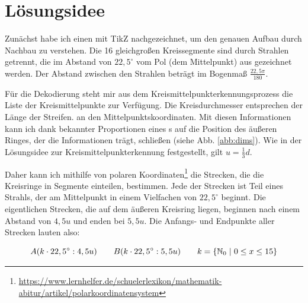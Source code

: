 \section{Lösungsidee}
	\begin{figure}
		\setlength\intextsep{0pt}
		\centering
		
		\caption{}
		\label{abb:spidergrafik}
		\vspace{-20pt}
	\end{figure}
	Zunächst habe ich einen \task{} mit TikZ nachgezeichnet, um den genauen Aufbau durch Nachbau zu verstehen. Die 16 gleichgroßen Kreissegmente sind durch Strahlen getrennt, die im Abstand von \(22,5^{\circ}\) vom Pol (dem Mittelpunkt) aus gezeichnet werden. Der Abstand zwischen den Strahlen beträgt im Bogenmaß \(\frac{22,5\pi}{180}\).

	Für die Dekodierung steht mir aus dem Kreismittelpunkterkennungsprozess die Liste der Kreismittelpunkte zur Verfügung. Die Kreisdurchmesser entsprechen der Länge der Streifen. an den Mittelpunktskoordinaten. Mit diesen Informationen kann ich dank bekannter Proportionen eines \task{}s auf die Position des äußeren Ringes, der die Informationen trägt, schließen (siehe Abb. \ref{abb:dims}). Wie in der Lösungsidee zur Kreismittelpunkterkennung festgestellt, gilt \(u=\frac{1}{3}d\).

	\begin{figure}
		\setlength\intextsep{0pt}
		\centering	
		
		\caption{}
		\label{abb:trigon}
	\end{figure}
	Daher kann ich mithilfe von polaren Koordinaten\footnote{\url{https://www.lernhelfer.de/schuelerlexikon/mathematik-abitur/artikel/polarkoordinatensystem}} die Strecken, die die Kreisringe in Segmente einteilen, bestimmen. Jede der Strecken ist Teil eines Strahls, der am Mittelpunkt in einem Vielfachen von \(22,5^{\circ}\) beginnt. Die eigentlichen Strecken, die auf dem äußeren Kreisring liegen, beginnen nach einem Abstand von \(4,5u\) und enden bei \(5,5u\). Die Anfangs- und Endpunkte aller Strecken lauten also:

	\begin{displaymath}
	A(k \cdot 22,5^{\circ}:4,5u) \hspace{2em} B(k \cdot 22,5^{\circ}:5,5u) \hspace{2em} k = \{\mathbb{N}_0 \hspace{0.3em}|\hspace{0.3em} 0 \le x \le 15\}
	\end{displaymath}

